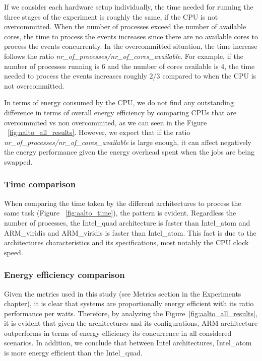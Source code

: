 If we consider each hardware setup individually, the time needed for running the three stages of the experiment is roughly the same, if the CPU is not overcommitted. When
the number of processes exceed the number of available cores, the time to 
process the events increases since there are no available cores to process the
events concurrently. In the overcommitted situation, the time increase follows
the ratio \textit{nr\_of\_processes/nr\_of\_cores\_available}. 
For example, if the
number of processes running is 6 and the number of cores available is 4, the
time needed to process the events increases roughly 2/3 compared to when the
CPU is not overcommitted.

In terms of energy consumed by the CPU, we do not find any outstanding difference in terms of overall energy efficiency by comparing CPUs that are overcommited vs non overcommited, as we can seen in the Figure ~\ref{fig:aalto_all_results}. However, we expect that if the ratio \textit{nr\_of\_processes/nr\_of\_cores\_available} is large enough, it can affect negatively the energy performance given the energy overhead spent when the jobs are being swapped.


\subsubsection*{Time comparison}
When comparing the time taken by the different architectures to process the same
task (Figure ~\ref{fig:aalto_time}), the pattern is evident. 
Regardless the number of processes, the 
Intel\_quad architecture is faster than Intel\_atom and ARM\_viridis and ARM\_viridis is faster than Intel\_atom.
This fact is due to the architectures characteristics and its specifications, most notably the CPU clock speed.\\


\subsubsection*{Energy efficiency comparison}
Given the metrics used in this study (see Metrics section in the Experiments chapter), it is clear that  
systems are  proportionally energy efficient with its ratio performance per 
watts. Therefore, by analyzing the Figure~\ref{fig:aalto_all_results}, it is evident that given the architectures and its configurations, ARM architecture outperforms in terms of energy efficiency its concurrence in all considered 
scenarios. In addition, we conclude that between Intel architectures, Intel\_atom is more energy efficient than the Intel\_quad. 


